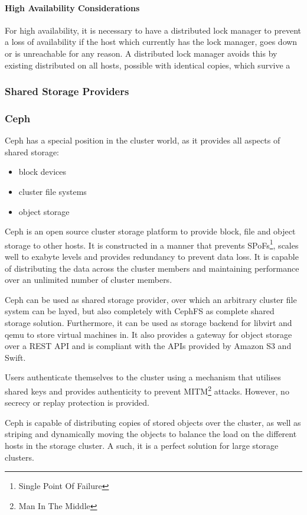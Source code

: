 \paragraph{High Availability Considerations}
For high availability, it is necessary to have a distributed lock manager to prevent
a loss of availability if the host which currently has the lock manager, goes down or
is unreachable for any reason. A distributed lock manager avoids this by existing
distributed on all hosts, possible with identical copies, which survive a 
\subsubsection{Shared Storage Providers}
\subsubsection{Ceph}
Ceph has a special position in the cluster world, as it provides all aspects of shared storage:
\begin{itemize}
\item block devices
\item cluster file systems
\item object storage
\end{itemize}

Ceph is an open source cluster storage platform to provide block, file and object storage to other hosts. It is constructed in a manner that prevents SPoFs\footnote{Single Point Of Failure}, scales well to exabyte levels and provides redundancy to prevent data loss. It is capable of distributing the data across the cluster members and maintaining performance over an unlimited number of cluster members.

Ceph can be used as shared storage provider, over which an arbitrary cluster file system can be layed, but also completely with CephFS as complete shared storage solution. Furthermore, it can be used as storage backend for libvirt and qemu to store virtual machines in. It also provides a gateway for object storage over a REST API and is compliant with the APIs provided by Amazon S3 and Swift.\cite{ceph_architecture}

Users authenticate themselves to the cluster using a mechanism that utilises shared keys and provides authenticity to prevent MITM\footnote{Man In The Middle} attacks. However, no secrecy or replay protection is provided\cite{ceph_architecture}\cite{crush}.

Ceph is capable of distributing copies of stored objects over the cluster, as well as striping and dynamically moving the objects to balance the load on the different hosts in the storage cluster. A such, it is a perfect solution for large storage clusters.

